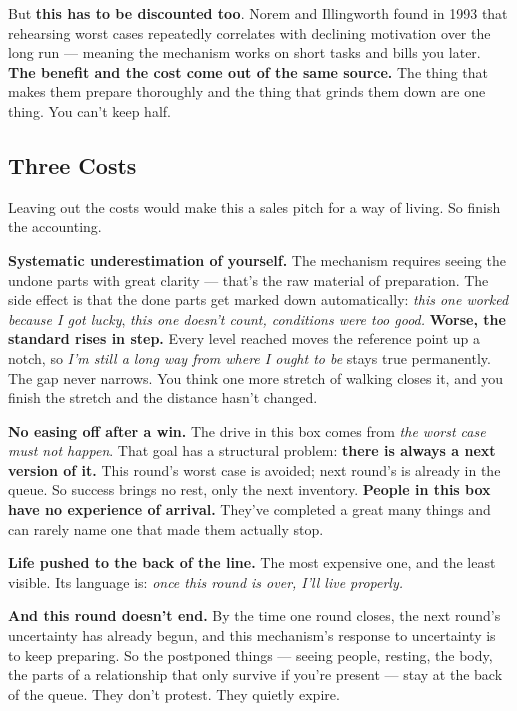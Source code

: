 \documentclass[11pt,a4paper]{article}
\begin{document}
But \textbf{this has to be discounted too}. Norem and Illingworth found in 1993 that rehearsing worst cases repeatedly correlates with declining motivation over the long run --- meaning the mechanism works on short tasks and bills you later. \textbf{The benefit and the cost come out of the same source.} The thing that makes them prepare thoroughly and the thing that grinds them down are one thing. You can't keep half.

\subsection{Three Costs}

Leaving out the costs would make this a sales pitch for a way of living. So finish the accounting.

\textbf{Systematic underestimation of yourself.} The mechanism requires seeing the undone parts with great clarity --- that's the raw material of preparation. The side effect is that the done parts get marked down automatically: \textit{this one worked because I got lucky}, \textit{this one doesn't count, conditions were too good.} \textbf{Worse, the standard rises in step.} Every level reached moves the reference point up a notch, so \textit{I'm still a long way from where I ought to be} stays true permanently. The gap never narrows. You think one more stretch of walking closes it, and you finish the stretch and the distance hasn't changed.

\textbf{No easing off after a win.} The drive in this box comes from \textit{the worst case must not happen}. That goal has a structural problem: \textbf{there is always a next version of it.} This round's worst case is avoided; next round's is already in the queue. So success brings no rest, only the next inventory. \textbf{People in this box have no experience of arrival.} They've completed a great many things and can rarely name one that made them actually stop.

\textbf{Life pushed to the back of the line.} The most expensive one, and the least visible. Its language is: \textit{once this round is over, I'll live properly.}

\textbf{And this round doesn't end.} By the time one round closes, the next round's uncertainty has already begun, and this mechanism's response to uncertainty is to keep preparing. So the postponed things --- seeing people, resting, the body, the parts of a relationship that only survive if you're present --- stay at the back of the queue. They don't protest. They quietly expire.
\end{document}

